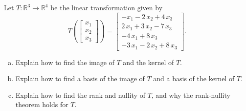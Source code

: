 
\begin{exerciseStatement}
 Let \(T:\mathbb{R}^ 3  \to \mathbb{R}^ 4 \) be the linear transformation given by \[T\left(  \left[\begin{array}{c}
x_{1} \\
x_{2} \\
x_{3}
\end{array}\right]  \right) =  \left[\begin{array}{c}
-x_{1} - 2 \, x_{2} + 4 \, x_{3} \\
2 \, x_{1} + 3 \, x_{2} - 7 \, x_{3} \\
-4 \, x_{1} + 8 \, x_{3} \\
-3 \, x_{1} - 2 \, x_{2} + 8 \, x_{3}
\end{array}\right] .\]
\begin{enumerate}[(a)]
\item Explain how to find the image of \(T\) and the kernel of \(T\).
\item Explain how to find a basis of the image of \(T\) and a basis of the kernel of \(T\).
\item Explain how to find the rank and nullity of \(T\), and why the rank-nullity theorem holds for \(T\).
\end{enumerate}
    
\end{exerciseStatement}
    
